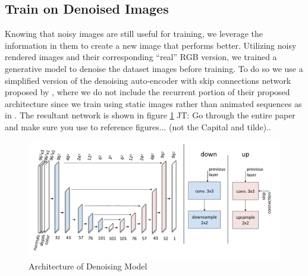\documentclass[10pt,twocolumn,letterpaper]{article}
\newcommand{\tompson}[1]{{\color{green} JT: #1}}
\begin{document}
\subsection{Train on Denoised Images} \label{denoising}
Knowing that noisy images are still useful for training, we leverage the information in them to create a new image that performs better. Utilizing noisy rendered images and their corresponding ``real'' RGB version, we trained a generative model to denoise the dataset images before training. To do so we use a simplified version of the denoising auto-encoder with skip connections network proposed by \cite{Chaitanya:2017:IRM:3072959.3073601}, where we do not include the recurrent portion of their proposed architecture since we train using static images rather than animated sequences as in \cite{Chaitanya:2017:IRM:3072959.3073601}. The resultant network is shown in figure \ref{fig:denoise} \tompson{Go through the entire paper and make sure you use \text{Figure~\ref{}} to reference figures... (not the Capital and tilde).}. 
\begin{figure}[h!]
\centering
\includegraphics[width=1.0\columnwidth]{./assets/denoiser_diagram.pdf}
\caption{Architecture of Denoising Model}
\label{fig:denoise}
\end{figure}
\end{document}
